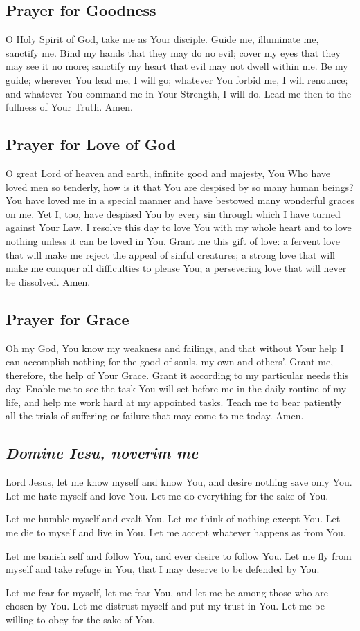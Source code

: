 \documentclass[12pt]{article}
\newcommand{\prayertitle}[1]{\subsection{#1}}
\newcommand{\emphasis}[1]{\emph{#1}}
\newcommand{\emphasis}[1]{\textsl{#1}}
\newcommand{\foreign}[1]{\emphasis{#1}}
\begin{document}
\prayertitle{Prayer for Goodness}
O Holy Spirit of God, take me as Your disciple.
Guide me, illuminate me, sanctify me.
Bind my hands that they may do no evil;
cover my eyes that they may see it no more;
sanctify my heart that evil may not dwell within me.
Be my guide;
wherever You lead me, I will go;
whatever You forbid me, I will renounce;
and whatever You command me in Your Strength, I will do.
Lead me then to the fullness of Your Truth.
Amen.

\prayertitle{Prayer for Love of God}
O great Lord of heaven and earth, infinite good and majesty, You Who have loved men so tenderly, how is it that You are despised by so many human beings?
You have loved me in a special manner and have bestowed many wonderful graces on me.
Yet I, too, have despised You by every sin through which I have turned against Your Law.
I resolve this day to love You with my whole heart and to love nothing unless it can be loved in You.
Grant me this gift of love:
a fervent love that will make me reject the appeal of sinful creatures;
a strong love that will make me conquer all difficulties to please You;
a persevering love that will never be dissolved.
Amen.

\prayertitle{Prayer for Grace}
\label{prayer:grace}
Oh my God, You know my weakness and failings, and that without Your help I can accomplish nothing for the good of souls, my own and others'.
Grant me, therefore, the help of Your Grace.
Grant it according to my particular needs this day.
Enable me to see the task You will set before me in the daily routine of my life, and help me work hard at my appointed tasks.
Teach me to bear patiently all the trials of suffering or failure that may come to me today. Amen.

\prayertitle{\foreign{Domine Iesu, noverim me}}
\label{prayer:noverim_me}
Lord Jesus, let me know myself and know You,
and desire nothing save only You.
Let me hate myself and love You.
Let me do everything for the sake of You.

Let me humble myself and exalt You.
Let me think of nothing except You.
Let me die to myself and live in You.
Let me accept whatever happens as from You.

Let me banish self and follow You,
and ever desire to follow You.
Let me fly from myself and take refuge in You,
that I may deserve to be defended by You.

Let me fear for myself, let me fear You,
and let me be among those who are chosen by You.
Let me distrust myself and put my trust in You.
Let me be willing to obey for the sake of You.
\end{document}
